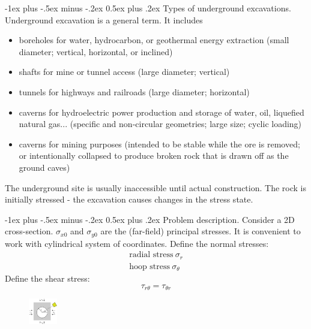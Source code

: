 \documentclass[10pt,landscape,a4paper]{article}
\makeatletter
\renewcommand{\section}{\@startsection{section}{1}{0mm}%
	{-1ex plus -.5ex minus -.2ex}%
	{0.5ex plus .2ex}%
	{\normalfont\large\bfseries}}
\makeatother
\begin{document}
\begin{multicols}{3}
		\section{Types of underground excavations.}
		Underground excavation is a general term.
		It includes
			\begin{itemize}
				\item boreholes for water, hydrocarbon, or geothermal energy extraction (small diameter; vertical, horizontal, or inclined)
				\item shafts for mine or tunnel access (large diameter; vertical)
				\item tunnels for highways and railroads (large diameter; horizontal)
				\item caverns for hydroelectric power production and storage of water, oil, liquefied natural gas... (specific and non-circular geometries; large size; cyclic loading)
				\item caverns for mining purposes (intended to be stable while the ore is removed; or intentionally collapsed to produce broken rock that is drawn off as the ground caves)
			\end{itemize}
		The underground site is usually inaccessible until actual construction.
		The rock is initially stressed - the excavation causes changes in the stress state.
		
		\section{Problem description.}
		Consider a 2D cross-section.
		$\sigma_{x0}$ and $\sigma_{y0}$ are the (far-field) principal stresses.
		It is convenient to work with cylindrical system of coordinates.
		Define the normal stresses:
		\begin{align*}
			\text{radial stress} \ \sigma_r\\
			\text{hoop stress} \ \sigma_\theta
		\end{align*}
		Define the shear stress:
		\[
			\tau_{r\theta}=\tau_{\theta r}
		\]
		\begin{figure}[H]
			\centering
			\includegraphics[width=0.11\textwidth]{kirsch-analytical}
		\end{figure}
		

\end{multicols}
\end{document}

